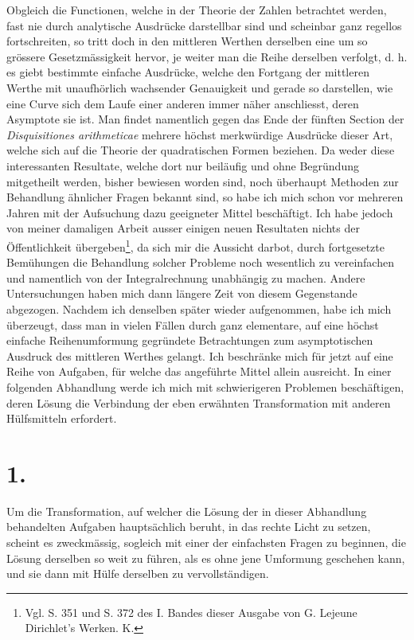 \documentclass[11pt]{article}
\begin{document}
Obgleich die Functionen, welche in der Theorie der Zahlen betrachtet werden, fast nie durch analytische Ausdrücke darstellbar sind und scheinbar ganz regellos fortschreiten, so tritt doch in den mittleren Werthen derselben eine um so grössere Gesetzmässigkeit hervor, je weiter man die Reihe derselben verfolgt, d. h. es giebt bestimmte einfache Ausdrücke, welche den Fortgang der mittleren Werthe mit unaufhörlich wachsender Genauigkeit und gerade so darstellen, wie eine Curve sich dem Laufe einer anderen immer näher anschliesst, deren Asymptote sie ist. Man findet namentlich gegen das Ende der fünften Section der \emph{Disquisitiones arithmeticae} mehrere höchst merkwürdige Ausdrücke dieser Art, welche sich auf die Theorie der quadratischen Formen beziehen. Da weder diese interessanten Resultate, welche dort nur beiläufig und ohne Begründung mitgetheilt werden, bisher bewiesen worden sind, noch überhaupt Methoden zur Behandlung ähnlicher Fragen bekannt sind, so habe ich mich schon vor mehreren Jahren mit der Aufsuchung dazu geeigneter Mittel beschäftigt. Ich habe jedoch von meiner damaligen Arbeit ausser einigen neuen Resultaten nichts der Öffentlichkeit übergeben\footnote{Vgl. S. 351 und S. 372 des I. Bandes dieser Ausgabe von G. Lejeune Dirichlet's Werken. K.}, da sich mir die Aussicht darbot, durch fortgesetzte Bemühungen die Behandlung solcher Probleme noch wesentlich zu vereinfachen und namentlich von der Integralrechnung unabhängig zu machen. Andere Untersuchungen haben mich dann längere Zeit von diesem Gegenstande abgezogen. Nachdem ich denselben später wieder aufgenommen, habe ich mich überzeugt, dass man in vielen Fällen durch ganz elementare, auf eine höchst einfache Reihenumformung gegründete Betrachtungen zum asymptotischen Ausdruck des mittleren Werthes gelangt. Ich beschränke mich für jetzt auf eine Reihe von Aufgaben, für welche das angeführte Mittel allein ausreicht. In einer folgenden Abhandlung werde ich mich mit schwierigeren Problemen beschäftigen, deren Lösung die Verbindung der eben erwähnten Transformation mit anderen Hülfsmitteln erfordert.

\section*{1.}

Um die Transformation, auf welcher die Lösung der in dieser Abhandlung behandelten Aufgaben hauptsächlich beruht, in das rechte Licht zu setzen, scheint es zweckmässig, sogleich mit einer der einfachsten Fragen zu beginnen, die Lösung derselben so weit zu führen, als es ohne jene Umformung geschehen kann, und sie dann mit Hülfe derselben zu vervollständigen.
\end{document}
